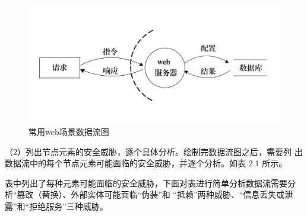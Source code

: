 \begin{figure}
    \centering
    \includegraphics[scale=0.4]{resources/img/i7.jpg}
    \caption{常用web场景数据流图}
  \end{figure}
  （2）列出节点元素的安全威胁，逐个具体分析。绘制完数据流图之后，需要列
  出数据流中的每个节点元素可能面临的安全威胁，并逐个分析。如表 2.1 所示。

  表中列出了每种元素可能面临的安全威胁，下面对表进行简单分析数据流需要分析“篡改（替换）、外部实体可能面临“伪装”和
  “抵赖”两种威胁、“信息丢失或泄露”和“拒绝服务”三种威胁。

